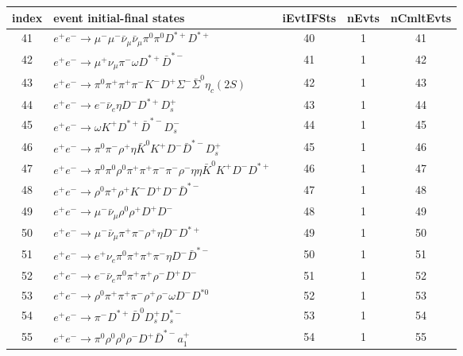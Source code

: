 \documentclass[landscape]{article}
\begin{document}
\begin{table}[htbp!]
\small
\centering
\begin{tabular}{|c|>{\centering}p{18cm}|c|c|c|}
\hline
index & event initial-final states & iEvtIFSts & nEvts & nCmltEvts \\
\hline
41 & $ e^{+} e^{-} \rightarrow \mu^{-} \mu^{-} \bar{\nu}_{\mu} \bar{\nu}_{\mu} \pi^{0} \pi^{0} D^{*+} D^{*+} $ & 40 & 1 & 41 \\
\hline
42 & $ e^{+} e^{-} \rightarrow \mu^{+} \nu_{\mu} \pi^{-} \omega D^{*+} \bar{D}^{*-} $ & 41 & 1 & 42 \\
\hline
43 & $ e^{+} e^{-} \rightarrow \pi^{0} \pi^{+} \pi^{+} \pi^{-} K^{-} D^{+} \Sigma^{-} \bar{\Sigma}^{0} \eta_{c}(2S) $ & 42 & 1 & 43 \\
\hline
44 & $ e^{+} e^{-} \rightarrow e^{-} \bar{\nu}_{e} \eta D^{-} D^{*+} D_{s}^{+} $ & 43 & 1 & 44 \\
\hline
45 & $ e^{+} e^{-} \rightarrow \omega K^{+} D^{*+} \bar{D}^{*-} D_{s}^{-} $ & 44 & 1 & 45 \\
\hline
46 & $ e^{+} e^{-} \rightarrow \pi^{0} \pi^{-} \rho^{+} \eta \bar{K}^{0} K^{+} D^{-} \bar{D}^{*-} D_{s}^{+} $ & 45 & 1 & 46 \\
\hline
47 & $ e^{+} e^{-} \rightarrow \pi^{0} \pi^{0} \rho^{0} \pi^{+} \pi^{+} \pi^{-} \pi^{-} \rho^{-} \eta \eta \bar{K}^{0} K^{+} D^{-} D^{*+} $ & 46 & 1 & 47 \\
\hline
48 & $ e^{+} e^{-} \rightarrow \rho^{0} \pi^{+} \rho^{+} K^{-} D^{+} D^{-} \bar{D}^{*-} $ & 47 & 1 & 48 \\
\hline
49 & $ e^{+} e^{-} \rightarrow \mu^{-} \bar{\nu}_{\mu} \rho^{0} \rho^{+} D^{+} D^{-} $ & 48 & 1 & 49 \\
\hline
50 & $ e^{+} e^{-} \rightarrow \mu^{-} \bar{\nu}_{\mu} \pi^{+} \pi^{-} \rho^{+} \eta D^{-} D^{*+} $ & 49 & 1 & 50 \\
\hline
51 & $ e^{+} e^{-} \rightarrow e^{+} \nu_{e} \pi^{0} \pi^{+} \pi^{+} \pi^{-} \eta D^{-} \bar{D}^{*-} $ & 50 & 1 & 51 \\
\hline
52 & $ e^{+} e^{-} \rightarrow e^{-} \bar{\nu}_{e} \pi^{0} \pi^{+} \pi^{+} \rho^{-} D^{+} D^{-} $ & 51 & 1 & 52 \\
\hline
53 & $ e^{+} e^{-} \rightarrow \rho^{0} \pi^{+} \pi^{+} \pi^{-} \rho^{+} \rho^{-} \omega D^{-} D^{*0} $ & 52 & 1 & 53 \\
\hline
54 & $ e^{+} e^{-} \rightarrow \pi^{-} D^{*+} \bar{D}^{0} D_{s}^{+} D_{s}^{*-} $ & 53 & 1 & 54 \\
\hline
55 & $ e^{+} e^{-} \rightarrow \pi^{0} \rho^{0} \rho^{0} \rho^{-} D^{+} \bar{D}^{*-} a_{1}^{+} $ & 54 & 1 & 55 \\

\end{tabular}
\end{table}
\end{document}
